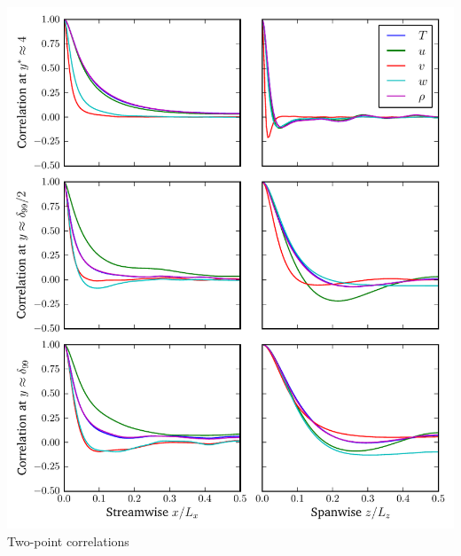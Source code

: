 \documentclass[mathserif]{beamer}
\begin{document}
\begin{frame}
\begin{columns}
\begin{column}{0.5\linewidth}
          \includegraphics[width=\textwidth]{autocorr-turb4134}
          \\\vspace{-0.5em}
          Two-point correlations
        \end{column}
    \end{columns}
\end{frame}
\end{document}
